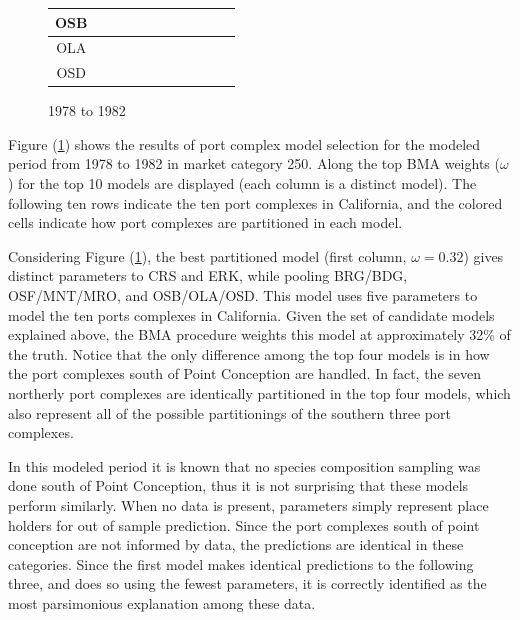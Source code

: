 \documentclass[12pt]{article}
\begin{document}
\begin{figure}[!h]
\begin{tabular}{|c|c|c|c|c|c|c|c|c|c|c|}
        OSB&\cellcolor[HTML]{FF7F00}&\cellcolor[HTML]{FF7F00}&\cellcolor[HTML]{FF7F00}&\cellcolor[HTML]{FF7F00}&\cellcolor[HTML]{FF7F00}&\cellcolor[HTML]{FF7F00}&\cellcolor[HTML]{FF7F00}&\cellcolor[HTML]{FF7F00}&\cellcolor[HTML]{984EA3}&\cellcolor[HTML]{FF7F00} \\ \hline%
        OLA&\cellcolor[HTML]{FF7F00}&\cellcolor[HTML]{FFFF33}&\cellcolor[HTML]{FF7F00}&\cellcolor[HTML]{FFFF33}&\cellcolor[HTML]{FF7F00}&\cellcolor[HTML]{FFFF33}&\cellcolor[HTML]{FFFF33}&\cellcolor[HTML]{FFFF33}&\cellcolor[HTML]{FF7F00}&\cellcolor[HTML]{FF7F00} \\ \hline%
        OSD&\cellcolor[HTML]{FF7F00}&\cellcolor[HTML]{FFFF33}&\cellcolor[HTML]{FFFF33}&\cellcolor[HTML]{A65628}&\cellcolor[HTML]{FFFF33}&\cellcolor[HTML]{FFFF33}&\cellcolor[HTML]{A65628}&\cellcolor[HTML]{FFFF33}&\cellcolor[HTML]{FFFF33}&\cellcolor[HTML]{FF7F00} \\ \hline%
\end{tabular}
\caption{1978 to 1982}
\label{colorTab78}
\end{figure}

Figure (\ref{colorTab78}) shows the results of port complex model
selection for the modeled period from 1978 to 1982 in market category
250. Along the top BMA weights (\(\omega\)) for the top 10 models are
displayed (each column is a distinct model). The following ten rows
indicate the ten port complexes in California, and the colored cells
indicate how port complexes are partitioned in each model.

Considering Figure (\ref{colorTab78}), the best partitioned model
(first column, \(\omega=0.32\)) gives distinct parameters to CRS and
ERK, while pooling BRG/BDG, OSF/MNT/MRO, and OSB/OLA/OSD. This model
uses five parameters to model the ten ports complexes in California.
Given the set of candidate models explained above, the BMA procedure
weights this model at approximately 32\% of the truth. Notice that the
only difference among the top four models is in how the port complexes
south of Point Conception are handled. In fact, the seven northerly port
complexes are identically partitioned in the top four models, which also
represent all of the possible partitionings of the southern three port
complexes.

In this modeled period it is known that no species composition sampling
was done south of Point Conception, thus it is not surprising that these
models perform similarly. When no data is present, parameters simply
represent place holders for out of sample prediction. Since the port
complexes south of point conception are not informed by data, the
predictions are identical in these categories. Since the first model
makes identical predictions to the following three, and does so using
the fewest parameters, it is correctly identified as the most
parsimonious explanation among these data.
\end{document}
